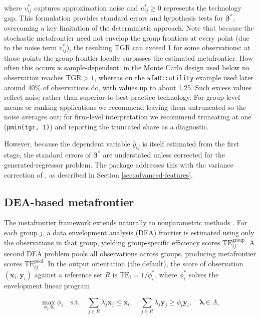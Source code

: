 where \(v^*_{ij}\) captures approximation noise and \(u^*_{ij} \geq 0\) represents
the technology gap. This formulation provides standard errors and hypothesis
tests for \(\boldsymbol{\beta}^*\), overcoming a key limitation of the
deterministic approach. Note that because the stochastic metafrontier need
not envelop the group frontiers at every point (due to the noise term
\(v^*_{ij}\)), the resulting TGR can exceed 1 for some observations: at those points
the group frontier locally surpasses the estimated metafrontier.
How often this occurs is sample-dependent: in the Monte Carlo design used
below no observation reaches \(\text{TGR} > 1\), whereas on the
\texttt{sfaR::utility} example used later around 40\% of observations do,
with values up to about 1.25. Such excess values reflect noise rather
than superior-to-best-practice technology. For group-level means or
ranking applications we recommend leaving them untruncated so the noise
averages out; for firm-level interpretation we recommend truncating at
one (\texttt{pmin(tgr,\ 1)}) and reporting the truncated share as a
diagnostic.

However, because the dependent variable \(\widehat{y}_{ij}\) is itself estimated
from the first stage, the standard errors of \(\boldsymbol{\beta}^*\) are
understated unless corrected for the generated-regressor problem. The
 package addresses this with the variance correction of
\citet{murphy1985}, as described in Section \ref{sec:advanced-features}.

\subsection{DEA-based metafrontier}\label{sec:dea-metafrontier}

The metafrontier framework extends naturally to nonparametric methods
\citep{odonnell2008, charnes1978}. For each group \(j\), a data envelopment analysis
(DEA) frontier is estimated using only the observations in that group, yielding
group-specific efficiency scores \(\text{TE}^{\text{group}}_{ij}\). A second DEA
problem pools all observations across groups, producing metafrontier scores
\(\text{TE}^{\text{pool}}_{ij}\). In the output orientation (the default), the
score of observation \((\mathbf{x}_i, \mathbf{y}_i)\) against a reference set
\(R\) is \(\text{TE}_i = 1/\phi^*_i\), where \(\phi^*_i\) solves the envelopment
linear program

\begin{equation}
\max_{\phi_i, \boldsymbol{\lambda}} \phi_i
\quad \text{s.t.} \quad
\sum_{j \in R} \lambda_j \mathbf{x}_j \leq \mathbf{x}_i, \quad
\sum_{j \in R} \lambda_j \mathbf{y}_j \geq \phi_i \mathbf{y}_i, \quad
\boldsymbol{\lambda} \in \Lambda,
\label{eq:dea-lp}
\end{equation}

